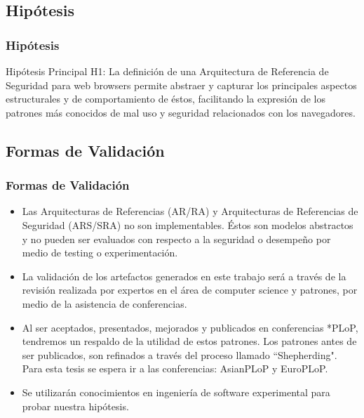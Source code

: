\documentclass[serif,9pt]{beamer}
\begin{document}
\subsection{Hipótesis}
\begin{frame}
	\frametitle{Hipótesis}	
	\begin{block}{Hipótesis Principal}
			H1: La definición de una Arquitectura de Referencia de Seguridad para web browsers permite abstraer y capturar los principales aspectos estructurales y de comportamiento de éstos, facilitando la expresión de los patrones más conocidos de mal uso y seguridad relacionados con los navegadores.
	\end{block}
\end{frame}

\subsection{Formas de Validación}
\begin{frame}
	\frametitle{Formas de Validación}	
	\begin{itemize}
	\item<1-> Las Arquitecturas de Referencias (AR/RA) y Arquitecturas de Referencias de Seguridad (ARS/SRA) no son implementables. Éstos son modelos abstractos y no pueden ser evaluados con respecto a la seguridad o desempeño por medio de testing o experimentación.
	\item<1-> La validación de los artefactos generados en este trabajo será a través de la revisión realizada por expertos en el área de computer science y patrones, por medio de la asistencia de conferencias. 
	\item<2-> Al ser aceptados, presentados, mejorados y publicados en conferencias *PLoP, tendremos un respaldo de la utilidad de estos patrones. Los patrones antes de ser publicados, son refinados a través del proceso llamado ``Shepherding". Para esta tesis se espera ir a las conferencias: AsianPLoP y EuroPLoP.
	\item<2-> Se utilizarán conocimientos en ingeniería de software experimental para probar nuestra hipótesis. 
	\end{itemize}
\end{frame}
\end{document}
